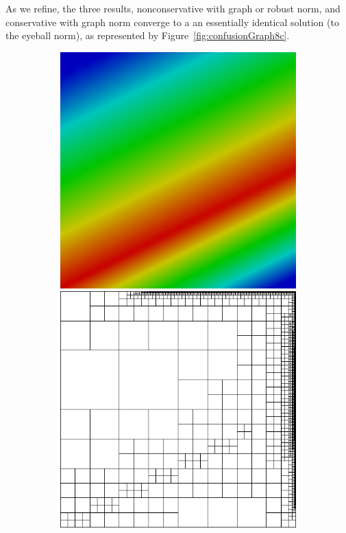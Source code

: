 \documentclass[letterpaper]{article}
\begin{document}
As we refine, the three results, nonconservative with graph or robust norm,
and conservative with graph norm converge to a an essentially identical
solution (to the eyeball norm), as represented by
Figure~\ref{fig:confusionGraph8c}. 


\begin{figure}
\centering
\begin{subfigure}[t]{0.45\textwidth}
\centering
\includegraphics[width=\textwidth]{figs/Confusion/graph8c.png}
\includegraphics[width=\textwidth]{figs/Confusion/graph8c_mesh.png}

\end{subfigure}
\end{figure}
\end{document}
